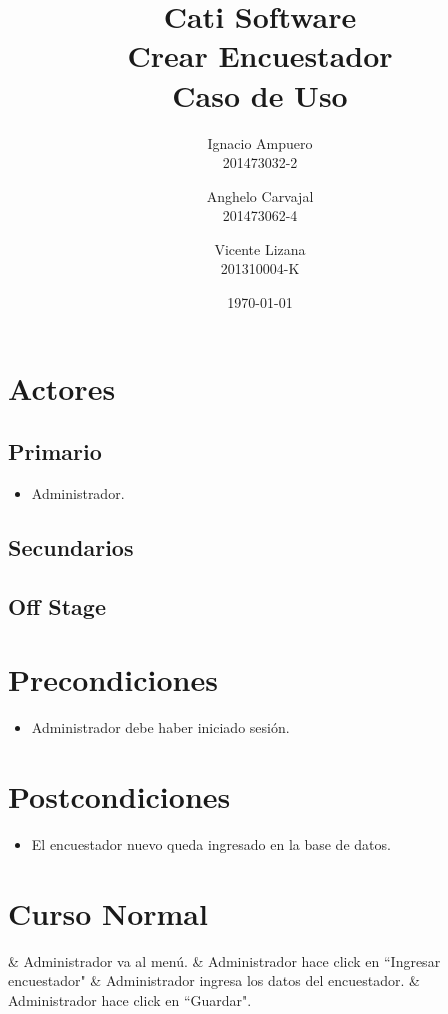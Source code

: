 \documentclass[fleqn]{article}
\title{\huge Cati Software\\ \Huge Crear Encuestador\\ \Large Caso de Uso \vspace{30pt}}
\author{Ignacio Ampuero\\ 201473032-2 \and Anghelo Carvajal\\ 201473062-4 \and Vicente Lizana\\ 201310004-K}
\date{\today}
\begin{document}
\maketitle

\vspace{30pt}

\section{Actores}

	\subsection{Primario}

	\begin{itemize}
		\item Administrador.
	\end{itemize}

	\subsection{Secundarios}

	\subsection{Off Stage}

\section{Precondiciones}

\begin{itemize}
	\item Administrador debe haber iniciado sesión.
\end{itemize}

\section{Postcondiciones}

\begin{itemize}
	\item El encuestador nuevo queda ingresado en la base de datos.
\end{itemize}

\section{Curso Normal}

\begin{easylist}
	& Administrador va al menú.
	& Administrador hace click en ``Ingresar encuestador"
	& Administrador ingresa los datos del encuestador.
	& Administrador hace click en ``Guardar".
\end{easylist}
\end{document}
